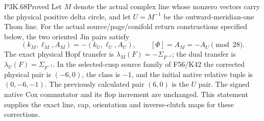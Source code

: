 \begin{statement}{P3K.68}{Proved}
Let \(M\) denote the actual complex line whose nonzero vectors
carry the physical positive delta circle, and let \(U=M^{-1}\) be
the outward-meridian-one Thom line. For the actual source/page/conifold
return constructions specified below, the two oriented Jin pairs satisfy
\[
 (k_M,\ell_M,A_M)=-(k_U,\ell_U,A_U),\qquad
 [\Phi]=A_M=-A_U\pmod {28}.
\]
The exact physical Hopf transfer is
\(\lambda_M(F)=-\Sigma_{F^{-1}}\); the dual transfer is
\(\lambda_U(F)=\Sigma_{F^{-1}}\). In the selected-cusp source
family of F56/K42 the corrected physical pair is \((-6,0)\),
the class is \(-1\), and the initial native relative tuple is
\((0,-6,-1)\). The previously calculated pair \((6,0)\) is the
\(U\) pair. The signed native Cox commutator and its flop increment
are unchanged. This statement supplies the exact line, cap, orientation
and inverse-clutch maps for these corrections.
\end{statement}
